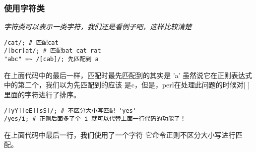 \documentclass{article}
\begin{document}
\subsubsection{使用字符类}
\textit{
字符类可以表示一类字符，我们还是看例子吧，这样比较清楚
}

\begin{verbatim}
/cat/; # 匹配cat
/[bcr]at/; # 匹配bat cat rat
"abc" =~ /[cab]/; 先匹配到 a
\end{verbatim}

在上面代码中的最后一样，匹配时最先匹配到的其实是 'a' 虽然说它在正则表达式中的第二个，我们以为先匹配到的应该
是c，但是，perl在处理此问题的时候对[ ]里面的字符进行了排序。

\begin{verbatim}
/[yY][eE][sS]/; # 不区分大小写匹配 'yes'
/yes/i; # 正则后面多了个 i 就可以代替上面一行代码的功能了！
\end{verbatim}

在上面代码中最后一行，我们使用了一个字符 它命令正则不区分大小写进行匹配。
\end{document}
